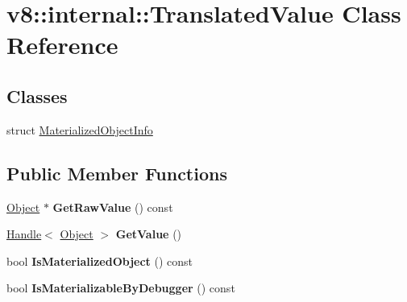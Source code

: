 \hypertarget{classv8_1_1internal_1_1_translated_value}{}\section{v8\+:\+:internal\+:\+:Translated\+Value Class Reference}
\label{classv8_1_1internal_1_1_translated_value}
\subsection*{Classes}
\begin{DoxyCompactItemize}
\item 
struct \hyperlink{structv8_1_1internal_1_1_translated_value_1_1_materialized_object_info}{Materialized\+Object\+Info}
\end{DoxyCompactItemize}
\subsection*{Public Member Functions}
\begin{DoxyCompactItemize}
\item 
\hyperlink{classv8_1_1internal_1_1_object}{Object} $\ast$ {\bfseries Get\+Raw\+Value} () const \hypertarget{classv8_1_1internal_1_1_translated_value_a4023767676fa243498ed0fcb2f614753}{}\label{classv8_1_1internal_1_1_translated_value_a4023767676fa243498ed0fcb2f614753}

\item 
\hyperlink{classv8_1_1internal_1_1_handle}{Handle}$<$ \hyperlink{classv8_1_1internal_1_1_object}{Object} $>$ {\bfseries Get\+Value} ()\hypertarget{classv8_1_1internal_1_1_translated_value_a8c9c57e125553e13c254225801b820f6}{}\label{classv8_1_1internal_1_1_translated_value_a8c9c57e125553e13c254225801b820f6}

\item 
bool {\bfseries Is\+Materialized\+Object} () const \hypertarget{classv8_1_1internal_1_1_translated_value_a916265710c529446b64d30a28d6a5939}{}\label{classv8_1_1internal_1_1_translated_value_a916265710c529446b64d30a28d6a5939}

\item 
bool {\bfseries Is\+Materializable\+By\+Debugger} () const \hypertarget{classv8_1_1internal_1_1_translated_value_a4ea55fc9a4c26293c31c1ccbd34b419a}{}\label{classv8_1_1internal_1_1_translated_value_a4ea55fc9a4c26293c31c1ccbd34b419a}

\end{DoxyCompactItemize}
